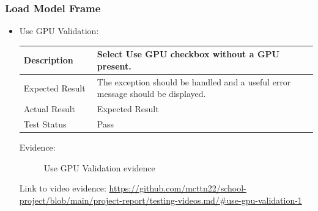 \documentclass[./project-report/src/latex/project-report.tex]{subfiles}
\begin{document}
\pagebreak

\subsubsection{Load Model Frame}
\label{sec:load-model-frame-input-validation}
\begin{itemize}
	\item Use GPU Validation: \newline\newline
		\begin{tabular}{|p{0.25\linewidth}|p{0.75\linewidth}|}
			\hline
			Description & Select Use GPU checkbox without a GPU present. \\
			\hline
			Expected Result & The exception should be handled and a useful error message should be displayed. \\
			\hline
			Actual Result & Expected Result \\
			\hline
			Test Status & Pass \\
			\hline
		\end{tabular}
		
		\vspace{5mm}

		Evidence:
		\begin{figure}[h!]
		\centering
		\caption{Use GPU Validation evidence}
		\end{figure}

		Link to video evidence: \url{https://github.com/mcttn22/school-project/blob/main/project-report/testing-videos.md/#use-gpu-validation-1}
\end{itemize}
\end{document}
